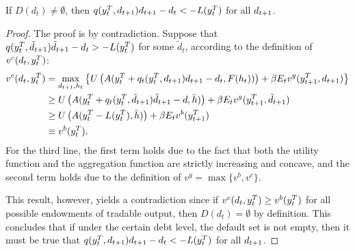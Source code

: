 \begin{proposition}
    \label{prop1}
    If $D(d_t) \neq \emptyset$, then $q(y^T_{t}, d_{t+1})d_{t+1} - d_t < -L(y^T_{t})$ for all $d_{t+1}$.
\end{proposition}
\begin{proof}
    The proof is by contradiction. Suppose that $q(y^T_{t}, \tilde{d}_{t+1})\tilde{d}_{t+1} - d_t > -L(y^T_{t})$ for some $\tilde{d}_t$, according to the definition of $v^c(d_t, y^T_{t})$:
    \begin{align*}
        v^c(d_t, y^T_{t}) &= \max_{d_{t+1}, h_t} \left\{
            U\left( A(y^T_{t} + q_t(y^T_{t}, d_{t+1}) d_{t+1} - d_t, F(h_t)) \right) +
            \beta E_t v^g(y^T_{t+1}, d_{t+1})
         \right\}\\
         &\ge U\left( A(y^T_{t} + q_t(y^T_{t}, \tilde{d}_{t+1}) \tilde{d}_{t+1} - d, \bar{h}) \right) +
            \beta E_t v^g(y^T_{t+1}, \tilde{d}_{t+1}) \\
         &\ge U\left( A(y^T_{t} -L(y^T_{t}), \bar{h}) \right) +
            \beta E_t v^b(y^T_{t+1}) \\
        &\equiv v^b(y^T_{t}).
    \end{align*}
    For the third line, the first term holds due to the fact that both the utility function and the aggregation function are strictly increasing and concave, and the second term holds due to the definition of  $v^g = \max\{v^b, v^c\}$.

    This result, however, yields a contradiction since if $v^c(d_t, y^T_{t}) \ge v^b(y^T_{t})$ for all possible endowments of tradable output, then $D(d_t) = \emptyset$ by definition. This concludes that if under the certain debt level, the default set is not empty, then it must be true that $q(y^T_{t}, d_{t+1})d_{t+1} - d_t < -L(y^T_{t})$ for all $d_{t+1}$.
\end{proof}

